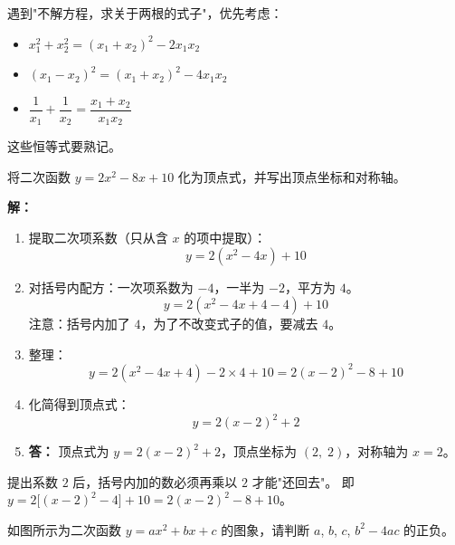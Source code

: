 \documentclass[12pt, a4paper]{ctexart}
\begin{document}
\begin{tipbox}[方法总结]
遇到"不解方程，求关于两根的式子"，优先考虑：
\begin{itemize}[leftmargin=2em]
  \item $x_1^2 + x_2^2 = (x_1+x_2)^2 - 2x_1x_2$
  \item $(x_1 - x_2)^2 = (x_1+x_2)^2 - 4x_1x_2$
  \item $\dfrac{1}{x_1} + \dfrac{1}{x_2} = \dfrac{x_1+x_2}{x_1 x_2}$
\end{itemize}
这些恒等式要熟记。
\end{tipbox}

\begin{examplebox}[【例题 6】配方求二次函数顶点]
将二次函数 $y = 2x^2 - 8x + 10$ 化为顶点式，并写出顶点坐标和对称轴。
\end{examplebox}

\textbf{解：}
\begin{enumerate}[leftmargin=2em]
  \item 提取二次项系数（只从含 $x$ 的项中提取）：
  \[
  y = 2(x^2 - 4x) + 10
  \]
  \item 对括号内配方：一次项系数为 $-4$，一半为 $-2$，平方为 $4$。
  \[
  y = 2(x^2 - 4x + 4 - 4) + 10
  \]
  注意：括号内加了 $4$，为了不改变式子的值，要减去 $4$。
  \item 整理：
  \[
  y = 2(x^2 - 4x + 4) - 2 \times 4 + 10 = 2(x - 2)^2 - 8 + 10
  \]
  \item 化简得到顶点式：
  \[
  y = 2(x - 2)^2 + 2
  \]
  \item \textbf{答：} 顶点式为 $y = 2(x-2)^2 + 2$，顶点坐标为 $(2,\; 2)$，对称轴为 $x = 2$。
\end{enumerate}

\begin{warnbox}[配方的关键]
提出系数 $2$ 后，括号内加的数必须再乘以 $2$ 才能"还回去"。
即 $y = 2\big[(x-2)^2 - 4\big] + 10 = 2(x-2)^2 - 8 + 10$。
\end{warnbox}

\begin{examplebox}
如图所示为二次函数 $y = ax^2 + bx + c$ 的图象，请判断 $a$, $b$, $c$, $b^2 - 4ac$ 的正负。

\begin{center}
\end{center}
\end{examplebox}
\end{document}
